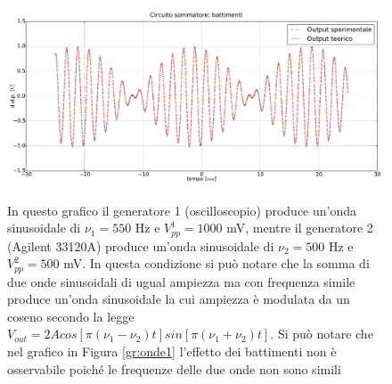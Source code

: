\begin{figure}[ht]
 \centering
   {\includegraphics[width=14.8cm]{../E01/latex/battimenti_ideali.pdf}}
 \caption{In questo grafico il generatore 1 (oscilloscopio) produce un'onda sinusoidale di $\nu_1=550$ \si{\hertz} e $V^1_{pp}=1000$ \si{\milli\volt}, mentre il generatore 2 (Agilent 33120A) produce un'onda sinusoidale di $\nu_2=500$ \si{\hertz} e $V^2_{pp}=500$ \si{\milli\volt}. In questa condizione si può notare che la somma di due onde sinusoidali di ugual ampiezza ma con frequenza simile produce un'onda sinusoidale la cui ampiezza è modulata da un coseno secondo la legge $V_{out} = 2Acos\left[\pi(\nu_1 - \nu_2)t\right]sin\left[\pi(\nu_1 + \nu_2)t\right]$. Si può notare che nel grafico in Figura \ref{gr:onde1} l'effetto dei battimenti non è osservabile poiché le frequenze delle due onde non sono simili} 
 \label{gr:battimenti}
\end{figure}